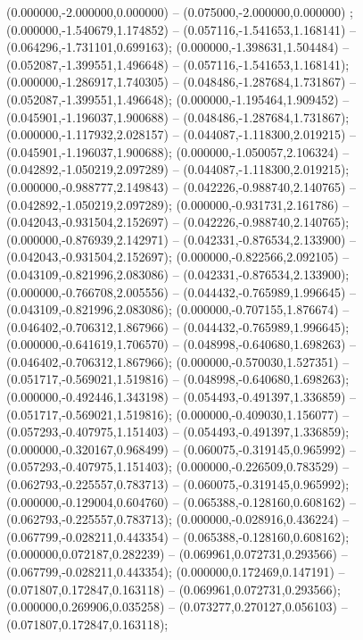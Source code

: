  (0.000000,-2.000000,0.000000) -- (0.075000,-2.000000,0.000000) ;
 (0.000000,-1.540679,1.174852) -- (0.057116,-1.541653,1.168141) -- (0.064296,-1.731101,0.699163);
 (0.000000,-1.398631,1.504484) -- (0.052087,-1.399551,1.496648) -- (0.057116,-1.541653,1.168141);
 (0.000000,-1.286917,1.740305) -- (0.048486,-1.287684,1.731867) -- (0.052087,-1.399551,1.496648);
 (0.000000,-1.195464,1.909452) -- (0.045901,-1.196037,1.900688) -- (0.048486,-1.287684,1.731867);
 (0.000000,-1.117932,2.028157) -- (0.044087,-1.118300,2.019215) -- (0.045901,-1.196037,1.900688);
 (0.000000,-1.050057,2.106324) -- (0.042892,-1.050219,2.097289) -- (0.044087,-1.118300,2.019215);
 (0.000000,-0.988777,2.149843) -- (0.042226,-0.988740,2.140765) -- (0.042892,-1.050219,2.097289);
 (0.000000,-0.931731,2.161786) -- (0.042043,-0.931504,2.152697) -- (0.042226,-0.988740,2.140765);
 (0.000000,-0.876939,2.142971) -- (0.042331,-0.876534,2.133900) -- (0.042043,-0.931504,2.152697);
 (0.000000,-0.822566,2.092105) -- (0.043109,-0.821996,2.083086) -- (0.042331,-0.876534,2.133900);
 (0.000000,-0.766708,2.005556) -- (0.044432,-0.765989,1.996645) -- (0.043109,-0.821996,2.083086);
 (0.000000,-0.707155,1.876674) -- (0.046402,-0.706312,1.867966) -- (0.044432,-0.765989,1.996645);
 (0.000000,-0.641619,1.706570) -- (0.048998,-0.640680,1.698263) -- (0.046402,-0.706312,1.867966);
 (0.000000,-0.570030,1.527351) -- (0.051717,-0.569021,1.519816) -- (0.048998,-0.640680,1.698263);
 (0.000000,-0.492446,1.343198) -- (0.054493,-0.491397,1.336859) -- (0.051717,-0.569021,1.519816);
 (0.000000,-0.409030,1.156077) -- (0.057293,-0.407975,1.151403) -- (0.054493,-0.491397,1.336859);
 (0.000000,-0.320167,0.968499) -- (0.060075,-0.319145,0.965992) -- (0.057293,-0.407975,1.151403);
 (0.000000,-0.226509,0.783529) -- (0.062793,-0.225557,0.783713) -- (0.060075,-0.319145,0.965992);
 (0.000000,-0.129004,0.604760) -- (0.065388,-0.128160,0.608162) -- (0.062793,-0.225557,0.783713);
 (0.000000,-0.028916,0.436224) -- (0.067799,-0.028211,0.443354) -- (0.065388,-0.128160,0.608162);
 (0.000000,0.072187,0.282239) -- (0.069961,0.072731,0.293566) -- (0.067799,-0.028211,0.443354);
 (0.000000,0.172469,0.147191) -- (0.071807,0.172847,0.163118) -- (0.069961,0.072731,0.293566);
 (0.000000,0.269906,0.035258) -- (0.073277,0.270127,0.056103) -- (0.071807,0.172847,0.163118);
